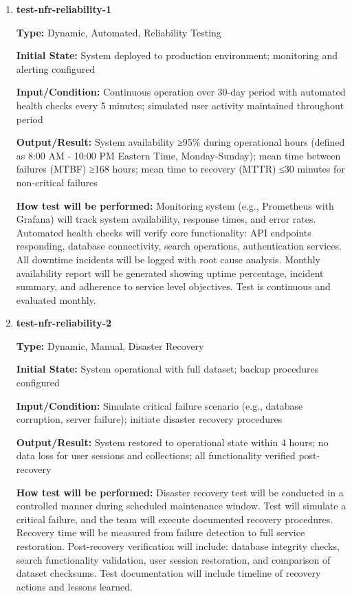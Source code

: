 \documentclass[12pt, titlepage]{article}
\begin{document}
\begin{enumerate}

\item \textbf{test-nfr-reliability-1}

\textbf{Type:} Dynamic, Automated, Reliability Testing
					
\textbf{Initial State:} System deployed to production environment; monitoring and alerting configured
					
\textbf{Input/Condition:} Continuous operation over 30-day period with automated health checks every 5 minutes; simulated user activity maintained throughout period
					
\textbf{Output/Result:} System availability ≥95\% during operational hours (defined as 8:00 AM - 10:00 PM Eastern Time, Monday-Sunday); mean time between failures (MTBF) ≥168 hours; mean time to recovery (MTTR) ≤30 minutes for non-critical failures
					
\textbf{How test will be performed:} Monitoring system (e.g., Prometheus with Grafana) will track system availability, response times, and error rates. Automated health checks will verify core functionality: API endpoints responding, database connectivity, search operations, authentication services. All downtime incidents will be logged with root cause analysis. Monthly availability report will be generated showing uptime percentage, incident summary, and adherence to service level objectives. Test is continuous and evaluated monthly.

\item \textbf{test-nfr-reliability-2}

\textbf{Type:} Dynamic, Manual, Disaster Recovery
					
\textbf{Initial State:} System operational with full dataset; backup procedures configured
					
\textbf{Input/Condition:} Simulate critical failure scenario (e.g., database corruption, server failure); initiate disaster recovery procedures
					
\textbf{Output/Result:} System restored to operational state within 4 hours; no data loss for user sessions and collections; all functionality verified post-recovery
					
\textbf{How test will be performed:} Disaster recovery test will be conducted in a controlled manner during scheduled maintenance window. Test will simulate a critical failure, and the team will execute documented recovery procedures. Recovery time will be measured from failure detection to full service restoration. Post-recovery verification will include: database integrity checks, search functionality validation, user session restoration, and comparison of dataset checksums. Test documentation will include timeline of recovery actions and lessons learned.

\end{enumerate}
\end{document}
